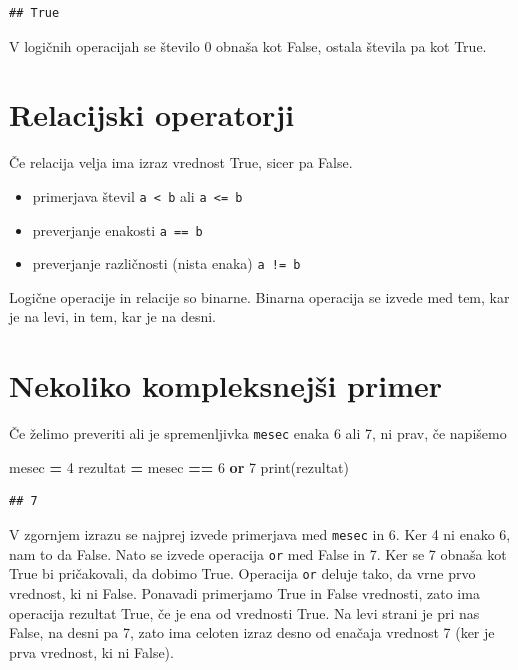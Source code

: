 \documentclass[
]{book}
\newenvironment{Shaded}{\begin{snugshade}}{\end{snugshade}}
\newcommand{\BuiltInTok}[1]{#1}
\newcommand{\DecValTok}[1]{\textcolor[rgb]{0.00,0.00,0.81}{#1}}
\newcommand{\KeywordTok}[1]{\textcolor[rgb]{0.13,0.29,0.53}{\textbf{#1}}}
\newcommand{\NormalTok}[1]{#1}
\newcommand{\OperatorTok}[1]{\textcolor[rgb]{0.81,0.36,0.00}{\textbf{#1}}}
\providecommand{\tightlist}{%
  \setlength{\itemsep}{0pt}\setlength{\parskip}{0pt}}
\begin{document}
\begin{verbatim}
## True
\end{verbatim}

V logičnih operacijah se število 0 obnaša kot False, ostala števila pa kot True.

\hypertarget{relacijski-operatorji}{%
\section{Relacijski operatorji}\label{relacijski-operatorji}}

Če relacija velja ima izraz vrednost True, sicer pa False.

\begin{itemize}
\tightlist
\item
  primerjava števil \texttt{a\ \textless{}\ b} ali \texttt{a\ \textless{}=\ b}
\item
  preverjanje enakosti \texttt{a\ ==\ b}
\item
  preverjanje različnosti (nista enaka) \texttt{a\ !=\ b}
\end{itemize}

Logične operacije in relacije so binarne. Binarna operacija se izvede med tem,
kar je na levi, in tem, kar je na desni.

\hypertarget{nekoliko-kompleksnejux161i-primer}{%
\section{Nekoliko kompleksnejši primer}\label{nekoliko-kompleksnejux161i-primer}}

Če želimo preveriti ali je spremenljivka \texttt{mesec} enaka 6 ali 7, ni prav, če napišemo

\begin{Shaded}
\begin{Highlighting}[]
\NormalTok{mesec }\OperatorTok{=} \DecValTok{4}
\NormalTok{rezultat }\OperatorTok{=}\NormalTok{ mesec }\OperatorTok{==} \DecValTok{6} \KeywordTok{or} \DecValTok{7}
\BuiltInTok{print}\NormalTok{(rezultat)}
\end{Highlighting}
\end{Shaded}

\begin{verbatim}
## 7
\end{verbatim}

V zgornjem izrazu se najprej izvede primerjava med \texttt{mesec} in 6. Ker 4 ni enako 6,
nam to da False. Nato se izvede operacija \texttt{or} med False in 7. Ker se 7 obnaša
kot True bi pričakovali, da dobimo True. Operacija \texttt{or} deluje tako, da vrne prvo
vrednost, ki ni False. Ponavadi primerjamo True in False vrednosti, zato ima
operacija rezultat True, če je ena od vrednosti True.
Na levi strani je pri nas False, na desni pa 7, zato ima celoten izraz desno
od enačaja vrednost 7 (ker je prva vrednost, ki ni False).
\end{document}
